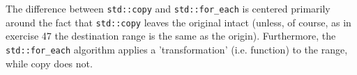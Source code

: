 The difference between \texttt{std::copy} and \texttt{std::for_each} is centered primarily around the fact that \texttt{std::copy} leaves the original intact (unless, of course, as in exercise 47 the destination range is the same as the origin). Furthermore, the \texttt{std::for_each} algorithm applies a 'transformation' (i.e. function) to the range, while copy does not.
